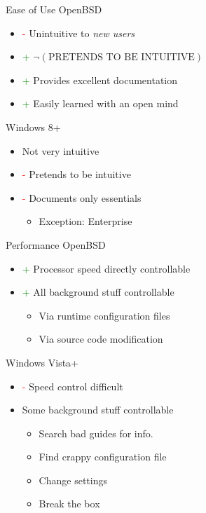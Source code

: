 \documentclass{beamer}
\newcommand{\good}{\textcolor{green}{+ }}
\newcommand{\bad}{\textcolor{red}{- }}
\begin{document}
			\begin{frame}{Ease of Use}
				OpenBSD
				\begin{itemize}
					\item \bad Unintuitive to \textit{new users}
					\item \good $\neg(\textrm{PRETENDS TO BE INTUITIVE})$
					\item \good Provides excellent documentation
					\item \good Easily learned with an open mind
				\end{itemize}
				Windows 8+
				\begin{itemize}
					\item Not very intuitive
					\item \bad Pretends to be intuitive
					\item \bad Documents only essentials
					\begin{itemize}
						\item Exception: Enterprise
					\end{itemize}
				\end{itemize}
			\end{frame}
			\begin{frame}{Performance}
				OpenBSD
				\begin{itemize}
					\item \good Processor speed directly controllable
					\item \good All background stuff controllable
					\begin{itemize}
						\item Via runtime configuration files
						\item Via source code modification
					\end{itemize}
				\end{itemize}
				Windows Vista+
				\begin{itemize}
					\item \bad Speed control difficult
					\item Some background stuff controllable
					\begin{itemize}
						\item Search bad guides for info.
						\item Find crappy configuration file
						\item Change settings
						\item Break the box
					\end{itemize}
				\end{itemize}
			\end{frame}
\end{document}
